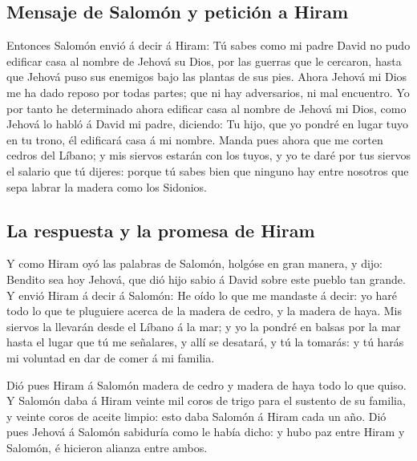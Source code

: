 \hypertarget{mensaje-de-salomuxf3n-y-peticiuxf3n-a-hiram}{%
\subsection{Mensaje de Salomón y petición a
Hiram}\label{mensaje-de-salomuxf3n-y-peticiuxf3n-a-hiram}}

 Entonces Salomón envió á decir á Hiram:  Tú
sabes como mi padre David no pudo edificar casa al nombre de Jehová su
Dios, por las guerras que le cercaron, hasta que Jehová puso sus
enemigos bajo las plantas de sus pies.  Ahora Jehová mi
Dios me ha dado reposo por todas partes; que ni hay adversarios, ni mal
encuentro.  Yo por tanto he determinado ahora edificar
casa al nombre de Jehová mi Dios, como Jehová lo habló á David mi padre,
diciendo: Tu hijo, que yo pondré en lugar tuyo en tu trono, él edificará
casa á mi nombre.  Manda pues ahora que me corten cedros
del Líbano; y mis siervos estarán con los tuyos, y yo te daré por tus
siervos el salario que tú dijeres: porque tú sabes bien que ninguno hay
entre nosotros que sepa labrar la madera como los Sidonios.

\hypertarget{la-respuesta-y-la-promesa-de-hiram}{%
\subsection{La respuesta y la promesa de
Hiram}\label{la-respuesta-y-la-promesa-de-hiram}}

 Y como Hiram oyó las palabras de Salomón, holgóse en gran
manera, y dijo: Bendito sea hoy Jehová, que dió hijo sabio á David sobre
este pueblo tan grande.  Y envió Hiram á decir á Salomón:
He oído lo que me mandaste á decir: yo haré todo lo que te pluguiere
acerca de la madera de cedro, y la madera de haya.  Mis
siervos la llevarán desde el Líbano á la mar; y yo la pondré en balsas
por la mar hasta el lugar que tú me señalares, y allí se desatará, y tú
la tomarás: y tú harás mi voluntad en dar de comer á mi familia.

 Dió pues Hiram á Salomón madera de cedro y madera de
haya todo lo que quiso.  Y Salomón daba á Hiram veinte
mil coros de trigo para el sustento de su familia, y veinte coros de
aceite limpio: esto daba Salomón á Hiram cada un año. 
Dió pues Jehová á Salomón sabiduría como le había dicho: y hubo paz
entre Hiram y Salomón, é hicieron alianza entre ambos.

